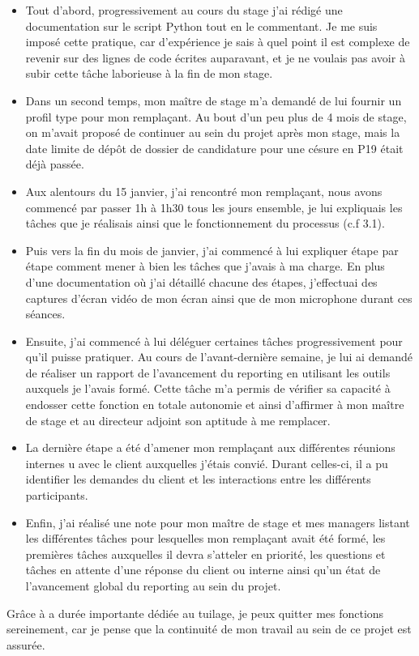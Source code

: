 \begin{itemize}
\item Tout d'abord, progressivement au cours du stage j'ai rédigé une documentation sur le script Python tout en le commentant. Je me suis imposé cette pratique, car d'expérience je sais à quel point il est complexe de revenir sur des lignes de code écrites auparavant, et je ne voulais pas avoir à subir cette tâche laborieuse à la fin de mon stage.
\item Dans un second temps, mon maître de stage m'a demandé de lui fournir un profil type pour mon remplaçant. Au bout d'un peu plus de 4 mois de stage, on m'avait proposé de continuer au sein du projet après mon stage, mais la date limite de dépôt de dossier de candidature pour une césure en P19 était déjà passée.
\item Aux alentours du 15 janvier, j'ai rencontré mon remplaçant, nous avons commencé par passer 1h à 1h30 tous les jours ensemble, je lui expliquais les tâches que je réalisais ainsi que le fonctionnement du processus (c.f 3.1).
\item Puis vers la fin du mois de janvier, j'ai commencé à lui expliquer étape par étape comment mener à bien les tâches que j'avais à ma charge. En plus d'une documentation où j'ai détaillé chacune des étapes, j'effectuai des captures d'écran vidéo de mon écran ainsi que de mon microphone durant ces séances.
\item Ensuite, j'ai commencé à lui déléguer certaines tâches progressivement pour qu'il puisse pratiquer. Au cours de l'avant-dernière semaine, je lui ai demandé de réaliser un rapport de l'avancement du \gls{reporting} en utilisant les outils auxquels je l'avais formé. Cette tâche m'a permis de vérifier sa capacité à endosser cette fonction en totale autonomie et ainsi d'affirmer à mon maître de stage et au directeur adjoint son aptitude à me remplacer.
\item La dernière étape a été d'amener mon remplaçant aux différentes réunions internes u avec le client auxquelles j'étais convié. Durant celles-ci, il a pu identifier les demandes du client et les interactions entre les différents participants.
\item Enfin, j'ai réalisé une note pour mon maître de stage et mes managers listant les différentes tâches pour lesquelles mon remplaçant avait été formé, les premières tâches auxquelles il devra s'atteler en priorité, les questions et tâches en attente d'une réponse du client ou interne ainsi qu'un état de l'avancement global du \gls{reporting} au sein du projet.
\end{itemize}

Grâce à a durée importante dédiée au tuilage, je peux quitter mes fonctions sereinement, car je pense que la continuité de mon travail au sein de ce projet est assurée.
